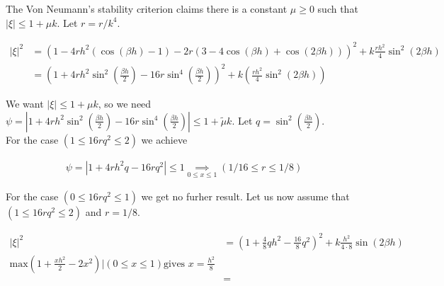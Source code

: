 The Von Neumann's stability criterion claims there is a constant $\mu \ge 0$ such that $|\xi| \le 1+ \mu k$. Let $r = r/k^4$.

\begin{align*}
|\xi |^2 &= (1-4rh^2(\cos(\beta h)-1)-2r(3-4\cos(\beta h)+\cos(2\beta h)))^2 + k\frac{rh^2}{4}\sin^2(2\beta h) \\
&= \left(1+4rh^2\sin^2\left(\frac{\beta h}{2}\right)-16r\sin^4\left(\frac{\beta h}{2}\right)\right)^2 + k\left(\frac{rh^2}{4}\sin^2(2\beta h)\right)
\end{align*}

We want $|\xi| \le 1+ \mu k$, so we need $\psi = |1+4rh^2\sin^2\left(\frac{\beta h}{2}\right)-16r\sin^4\left(\frac{\beta h}{2}\right)| \le 1 + \tilde{\mu}k$. Let $q = \sin^2\left(\frac{\beta h}{2}\right)$. \\For the case $(1 \le 16rq^2 \le 2)$ we achieve

\begin{align*}
\psi = \left| 1+4rh^2q -16rq^2\right| \le 1 \underset{0\le x\le 1}{\implies} \left(1/16 \le r \le 1/8 \right)
\end{align*} 

For the case $(0 \le 16rq^2 \le 1)$ we get no furher result. Let us now assume that $(1 \le 16rq^2 \le 2)$ and $r = 1/8$. 

\begin{align*}
|\xi |^2 &= \left(1 + \frac{4}{8}qh^2 - \frac{16}{8}q^2\right)^2 + k\frac{h^2}{4\cdot 8}\sin(2\beta h) \\
\textrm{max}\left(1 + \frac{xh^2}{2} - 2x^2\right) | (0 \le x \le 1) \textrm{gives } x = \frac{h^2}{8} \\
&= 
\end{align*}






